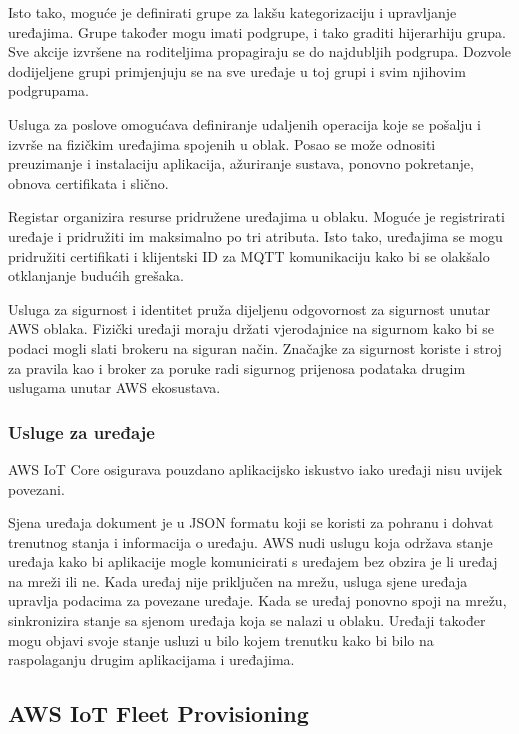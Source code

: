 Isto tako, moguće je definirati grupe za lakšu kategorizaciju i upravljanje uređajima. Grupe također mogu imati podgrupe, i tako graditi hijerarhiju grupa. Sve akcije izvršene na roditeljima propagiraju se do najdubljih podgrupa. Dozvole dodijeljene grupi primjenjuju se na sve uređaje u toj grupi i svim njihovim podgrupama. 

Usluga za poslove  omogućava definiranje udaljenih operacija koje se pošalju i izvrše na fizičkim uređajima spojenih u oblak. Posao se može odnositi preuzimanje i instalaciju aplikacija, ažuriranje sustava, ponovno pokretanje, obnova certifikata i slično.

Registar organizira resurse pridružene uređajima u oblaku. Moguće je registrirati uređaje i pridružiti im maksimalno po tri atributa. Isto tako, uređajima se mogu pridružiti certifikati i klijentski ID za MQTT komunikaciju kako bi se olakšalo otklanjanje budućih grešaka.

Usluga za sigurnost i identitet pruža dijeljenu odgovornost za sigurnost unutar AWS oblaka. Fizički uređaji moraju držati vjerodajnice na sigurnom kako bi se podaci mogli slati brokeru na siguran način. Značajke za sigurnost koriste i stroj za pravila kao i broker za poruke radi sigurnog prijenosa podataka drugim uslugama unutar AWS ekosustava.

\subsubsection{Usluge za uređaje}

AWS IoT Core osigurava pouzdano aplikacijsko iskustvo iako uređaji nisu uvijek povezani. 

Sjena uređaja  dokument je u JSON formatu koji se koristi za pohranu i dohvat trenutnog stanja i informacija o uređaju. AWS nudi uslugu koja održava stanje uređaja  kako bi aplikacije mogle komunicirati s uređajem bez obzira je li uređaj na mreži ili ne. Kada uređaj nije priključen na mrežu, usluga sjene uređaja upravlja podacima za povezane uređaje. Kada se uređaj ponovno spoji na mrežu, sinkronizira stanje sa sjenom uređaja koja se nalazi u oblaku. Uređaji također mogu objavi svoje stanje usluzi u bilo kojem trenutku kako bi bilo na raspolaganju drugim aplikacijama i uređajima. 

\subsection{AWS IoT Fleet Provisioning}



